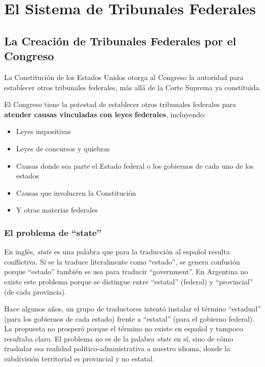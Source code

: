 \documentclass[12pt,oneside]{book}
\begin{document}
\newpage

\chapter{El Sistema de Tribunales Federales}

\section{La Creación de Tribunales Federales por el Congreso}

La Constitución de los Estados Unidos otorga al Congreso la autoridad para establecer otros tribunales federales, más allá de la Corte Suprema ya constituida.

\begin{important}
El Congreso tiene la potestad de establecer otros tribunales federales para \textbf{atender causas vinculadas con leyes federales}, incluyendo:
\begin{itemize}
    \item Leyes impositivas
    \item Leyes de concursos y quiebras
    \item Causas donde sea parte el Estado federal o los gobiernos de cada uno de los estados
    \item Causas que involucren la Constitución
    \item Y otras materias federales
\end{itemize}
\end{important}

\subsection{El problema de ``state''}

En inglés, \textit{state} es una palabra que para la traducción al español resulta conflictiva. Si se la traduce literalmente como ``estado'', se genera confusión porque ``estado'' también se usa para traducir ``government''. En Argentina no existe este problema porque se distingue entre ``estatal'' (federal) y ``provincial'' (de cada provincia).

Hace algunos años, un grupo de traductores intentó instalar el término ``estadual'' (para los gobiernos de cada estado) frente a ``estatal'' (para el gobierno federal). La propuesta no prosperó porque el término no existe en español y tampoco resultaba claro. El problema no es de la palabra \textit{state} en sí, sino de cómo trasladar esa realidad político-administrativa a nuestro idioma, donde la subdivisión territorial es provincial y no estatal.
\end{document}
